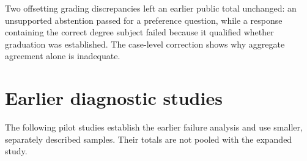 \documentclass[11pt]{article}
\begin{document}
Two offsetting grading discrepancies left an earlier public total unchanged: an unsupported abstention passed for a preference question, while a response containing the correct degree subject failed because it qualified whether graduation was established. The case-level correction shows why aggregate agreement alone is inadequate.

\section{Earlier diagnostic studies}
The following pilot studies establish the earlier failure analysis and use smaller, separately described samples. Their totals are not pooled with the expanded study.




\begingroup
\footnotesize
\raggedright
\setlength{\bibsep}{0pt}
\setlength{\parskip}{0pt}

\endgroup
\end{document}
